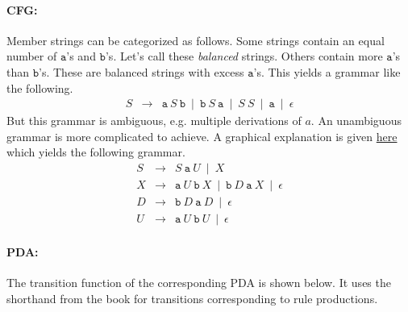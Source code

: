 \documentclass[a4page]{exam}
\newcommand{\Str}[1]{\mathtt{#1}}
\renewcommand{\a}{\Str{a}}
\renewcommand{\b}{\Str{b}}
\begin{document}
\begin{questions}
\begin{parts}
\begin{solution}
      \paragraph{CFG:} Member strings can be categorized as follows. Some strings contain an equal number of $\a$'s and $\b$'s. Let's call these \textit{balanced} strings. Others contain more $\a$'s than $\b$'s. These are balanced strings with excess $\a$'s. This yields a grammar like the following.
      \begin{eqnarray*}
        S &\rightarrow& \a\ S\ \b\ \mid\ \b\ S\ \a\ \mid\ S\ S\ \mid\ \a\ \mid\ \epsilon
      \end{eqnarray*}
      But this grammar is ambiguous, e.g. multiple derivations of $a$. An unambiguous grammar is more complicated to achieve. A graphical explanation is given \href{https://cs.stackexchange.com/questions/125516/unambiguous-context-free-grammar-for-strings-with-at-least-as-many-as-as-bs}{here} which yields the following grammar.
      \begin{eqnarray*}
        S & \rightarrow & S\ \a\ U\ \mid\ X\\
	X & \rightarrow & \a\ U\ \b\ X\ \mid\ \b\ D\ \a\ X\ \mid\ \epsilon\\
        D & \rightarrow & \b\ D\ \a\ D\ \mid\ \epsilon\\
        U & \rightarrow & \a\ U\ \b\ U\ \mid\ \epsilon
      \end{eqnarray*}
      
      \paragraph{PDA:} The transition function of the corresponding PDA is shown below. It uses the shorthand from the book for transitions corresponding to rule productions.

\end{solution}
\end{parts}
\end{questions}
\end{document}
